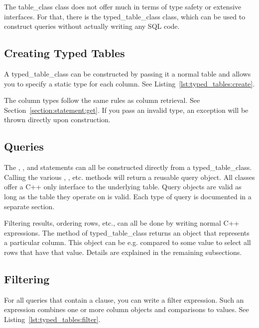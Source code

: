 The \gls{table_class} class does not offer much in terms of type safety or extensive interfaces. For that, there is the \gls{typed_table_class} class, which can be used to construct queries without actually writing any SQL code.

\subsection{Creating Typed Tables}
\label{section:typed_tables:create}

A \gls{typed_table_class} can be constructed by passing it a normal table and allows you to specify a static type for each column. See Listing~\ref{lst:typed_tables:create}.



The column types follow the same rules as column retrieval. See Section~\ref{section:statement:get}. If you pass an invalid type, an exception will be thrown directly upon construction.

\subsection{Queries}
\label{section:typed_tables:queries}

The , ,  and  statements can all be constructed directly from a \gls{typed_table_class}. Calling the various , , etc. methods will return a reusable query object. All classes offer a C++ only interface to the underlying table. Query objects are valid as long as the table they operate on is valid. Each type of query is documented in a separate section.

Filtering results, ordering rows, etc., can all be done by writing normal C++ expressions. The  method of \gls{typed_table_class} returns an object that represents a particular column. This object can be e.g. compared to some value to select all rows that have that value. Details are explained in the remaining subsections.

\subsection{Filtering}
\label{section:typed_tables:filter}

For all queries that contain a  clause, you can write a filter expression. Such an expression combines one or more column objects and comparisons to values. See Listing~\ref{lst:typed_tables:filter}.


